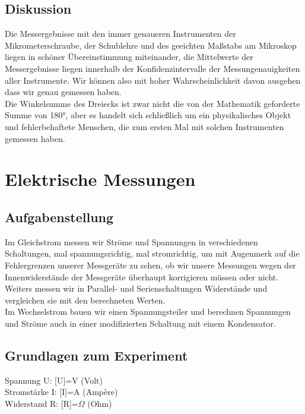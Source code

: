 \documentclass{article}
\begin{document}
\subsection{Diskussion}
Die Messergebnisse mit den immer genaueren Instrumenten der Mikrometerschraube, der Schublehre und des geeichten Maßstabs am Mikroskop liegen in schöner Übereinstimmung miteinander, die Mittelwerte der Messergebnisse liegen innerhalb der Konfidenzintervalle der Messungenauigkeiten aller Instrumente. Wir können also mit hoher Wahrscheinlichkeit davon ausgehen dass wir genau gemessen haben. \\
Die Winkelsumme des Dreiecks ist zwar nicht die von der Mathematik geforderte Summe von 180°, aber es handelt sich schließlich um ein physikalisches Objekt und fehlerbehaftete Menschen, die zum ersten Mal mit solchen Instrumenten gemessen haben.
\section{Elektrische Messungen}
\subsection{Aufgabenstellung}
Im Gleichstrom messen wir Ströme und Spannungen in verschiedenen Schaltungen, mal spannungsrichtig, mal stromrichtig, um mit Augenmerk auf die Fehlergrenzen unserer Messgeräte zu sehen, ob wir unsere Messungen wegen der Innenwiderstände der Messgeräte überhaupt korrigieren müssen oder nicht.\\
Weiters messen wir in Parallel- und Serienschaltungen Widerstände und vergleichen sie mit den berechneten Werten.\\
Im Wechselstrom bauen wir einen Spannungsteiler und berechnen Spannungen und Ströme auch in einer modifizierten Schaltung mit einem Kondensator.
\\
\subsection{Grundlagen zum Experiment}
Spannung U: [U]=V (Volt)\\
Stromstärke I: [I]=A (Ampère)\\
Widerstand R: [R]=$\Omega$ (Ohm)\\
\end{document}
